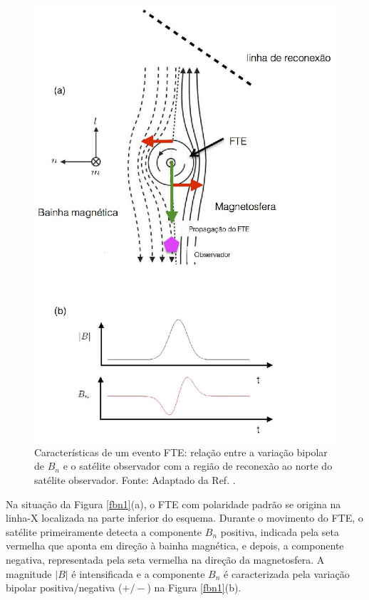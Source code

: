 \begin{figure}
	\begin{center}
		\includegraphics[scale=0.27]{fbn_fte_2.jpg}
		\caption{Características de um evento FTE: relação entre a variação bipolar de $B_{n}$ e o satélite observador com a região de reconexão ao norte do satélite observador. 
			Fonte: Adaptado da Ref. \cite{paschmann1982}.}
		\label{fbn2}
	\end{center}
\end{figure}

Na situação da Figura \ref{fbn1}(a), o FTE com polaridade padrão se origina na linha-X localizada na parte inferior do esquema. Durante o movimento do FTE, o satélite 
primeiramente detecta a componente $B_{n}$ positiva, indicada pela seta vermelha que aponta em direção à bainha magnética, e depois, a componente negativa, representada 
pela seta vermelha na direção da magnetosfera. A magnitude $\left|B\right|$ é intensificada e a componente $B_{n}$ é caracterizada pela variação bipolar positiva/negativa 
($+/-$) na Figura \ref{fbn1}(b). 

